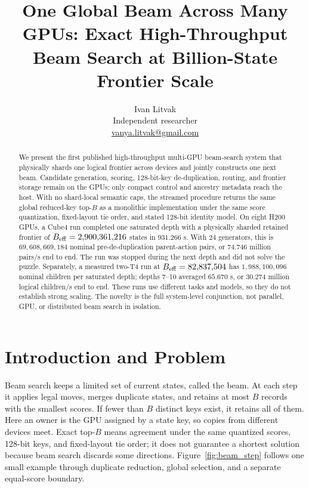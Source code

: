 \documentclass[10pt,twocolumn]{article}
\title{One Global Beam Across Many GPUs: Exact High-Throughput Beam Search at Billion-State Frontier Scale}
\author{Ivan Litvak\\Independent researcher\\\href{mailto:vanya.litvak@gmail.com}{vanya.litvak@gmail.com}}
\date{}
\begin{document}
\raggedbottom
\maketitle

\begin{abstract}
We present the first published high-throughput multi-GPU beam-search system
that physically shards one logical frontier across devices and jointly
constructs one next beam.  Candidate generation, scoring, 128-bit-key
de-duplication, routing, and frontier storage remain on the GPUs; only compact
control and ancestry metadata reach the host.  With no shard-local semantic
caps, the streamed procedure returns the same global reduced-key top-$B$ as a
monolithic implementation under the same score quantization, fixed-layout tie
order, and stated 128-bit identity model.  On eight H200 GPUs, a Cube4 run
completed one saturated depth with a physically sharded retained frontier of
$B_{\rm eff}=2{,}900{,}361{,}216$ states in $931.266$ s.  With 24 generators,
this is $69{,}608{,}669{,}184$ nominal pre-de-duplication parent-action pairs,
or $74.746$ million pairs/s end to end.  The run was stopped during the next
depth and did not solve the puzzle.  Separately, a measured two-T4 run at
$B_{\rm eff}=82{,}837{,}504$ has $1{,}988{,}100{,}096$ nominal children per
saturated depth; depths 7--10 averaged $65.670$ s, or $30.274$ million logical
children/s end to end.  These runs use different tasks and models, so they do
not establish strong scaling.  The novelty is the full system-level
conjunction, not parallel, GPU, or distributed beam search in isolation.
\end{abstract}

\section{Introduction and Problem}
Beam search keeps a limited set of current states, called the beam. At each
step it applies legal moves, merges duplicate states, and retains at most $B$
records with the smallest scores. If fewer than $B$ distinct keys exist, it
retains all of them. Here an owner is the GPU assigned by a state key, so
copies from different devices meet. Exact top-$B$ means agreement under the
same quantized scores, 128-bit keys, and fixed-layout tie order; it does not
guarantee a shortest solution because beam search discards some directions.
Figure~\ref{fig:beam_step} follows one small example through duplicate
reduction, global selection, and a separate equal-score boundary.
\end{document}
